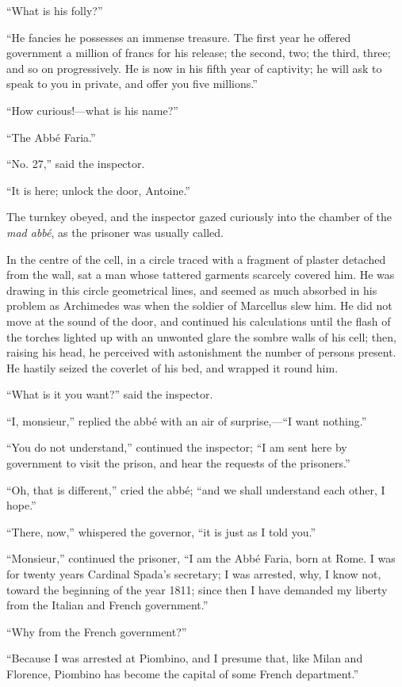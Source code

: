“What is his folly?”

“He fancies he possesses an immense treasure. The first year he offered
government a million of francs for his release; the second, two; the
third, three; and so on progressively. He is now in his fifth year of
captivity; he will ask to speak to you in private, and offer you five
millions.”

“How curious!—what is his name?”

“The Abbé Faria.”

“No. 27,” said the inspector.

“It is here; unlock the door, Antoine.”

The turnkey obeyed, and the inspector gazed curiously into the chamber
of the \textit{mad abbé}, as the prisoner was usually called.

In the centre of the cell, in a circle traced with a fragment of
plaster detached from the wall, sat a man whose tattered garments
scarcely covered him. He was drawing in this circle geometrical lines,
and seemed as much absorbed in his problem as Archimedes was when the
soldier of Marcellus slew him. He did not move at the sound of the
door, and continued his calculations until the flash of the torches
lighted up with an unwonted glare the sombre walls of his cell; then,
raising his head, he perceived with astonishment the number of persons
present. He hastily seized the coverlet of his bed, and wrapped it
round him.

“What is it you want?” said the inspector.

“I, monsieur,” replied the abbé with an air of surprise,—“I want
nothing.”

“You do not understand,” continued the inspector; “I am sent here by
government to visit the prison, and hear the requests of the
prisoners.”

“Oh, that is different,” cried the abbé; “and we shall understand each
other, I hope.”

“There, now,” whispered the governor, “it is just as I told you.”

“Monsieur,” continued the prisoner, “I am the Abbé Faria, born at Rome.
I was for twenty years Cardinal Spada’s secretary; I was arrested, why,
I know not, toward the beginning of the year 1811; since then I have
demanded my liberty from the Italian and French government.”

“Why from the French government?”

“Because I was arrested at Piombino, and I presume that, like Milan and
Florence, Piombino has become the capital of some French department.”

